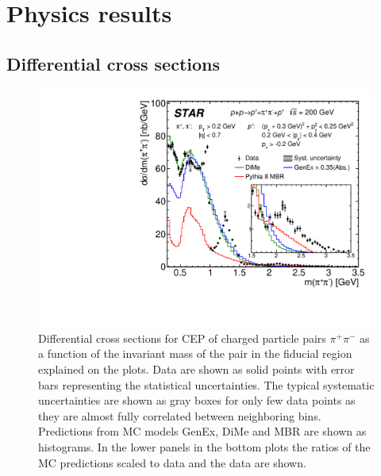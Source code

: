 

\chapter{Physics results}\label{chap:physicsResults}

\section{Differential cross sections}

\begin{figure}[h]
\centering
\includegraphics[width=.7\textwidth,page=1]{graphics/physicsResults/FinalResult_InvMass_pion.pdf}
%
\caption[Differential cross sections for CEP of charged particle pairs $\pi^+\pi^-$ as a function of the invariant mass of the pair in the fiducial region.]{Differential cross sections for CEP of charged particle pairs $\pi^+\pi^-$ as a function of the invariant mass of the pair in the fiducial region explained on the plots. Data are shown as solid points with error bars representing the statistical uncertainties. The typical systematic uncertainties are shown as gray boxes for only few data points as they are almost fully correlated between neighboring bins. Predictions from MC models GenEx, DiMe and MBR are shown as histograms. In the lower panels in the bottom plots the ratios of the MC predictions scaled to data and the data are shown.}
\label{results_01}
\end{figure}
%
